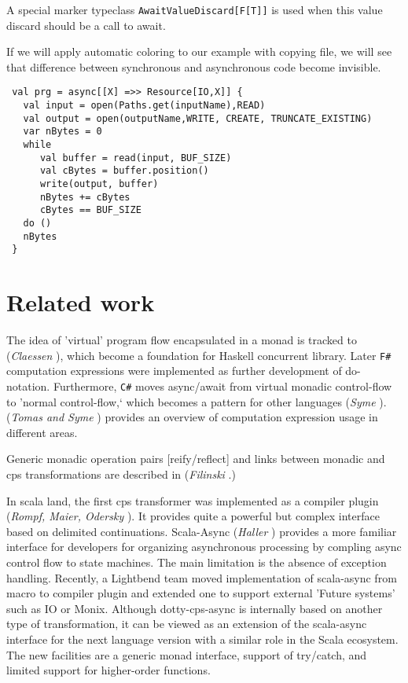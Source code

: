 \documentclass{llncs}
\begin{document}
 A special marker typeclass  \lstinline|AwaitValueDiscard[F[T]]| is used when this value discard should be a call to await.  

If we will apply automatic coloring to our example with copying file, we will see that difference between synchronous and asynchronous code become invisible.

\label{AACopyFileAC}
\begin{lstlisting}
 val prg = async[[X] =>> Resource[IO,X]] {
   val input = open(Paths.get(inputName),READ)
   val output = open(outputName,WRITE, CREATE, TRUNCATE_EXISTING)
   var nBytes = 0
   while
      val buffer = read(input, BUF_SIZE)
      val cBytes = buffer.position()
      write(output, buffer)
      nBytes += cBytes
      cBytes == BUF_SIZE
   do ()
   nBytes
 }
\end{lstlisting}



\section{ Related work } \label{RelatedWork}

The idea of 'virtual' program flow encapsulated in a monad is tracked to ({\it{Claessen}} \cite{claessen_1999}), which become a foundation for Haskell concurrent library.  Later \verb|F#| computation expressions were implemented as further development of do-notation. Furthermore, \verb|C#| moves async/await from virtual monadic control-flow to 'normal control-flow,‘  which becomes a pattern for other languages ({\it{Syme}} \cite{10.1145/3386325}). ({\it{Tomas and Syme}} \cite{computation-zoo-padl14}) provides an overview of computation expression usage in different areas.

 Generic monadic operation pairs [reify/reflect] and links between monadic and cps transformations are described in ({\it Filinski } \cite{10.1145/174675.178047}.)

 In scala land, the first cps transformer was implemented as a compiler plugin ({\it Rompf, Maier, Odersky })\cite{DBLP:conf/icfp/RompfMO09}. It provides quite a powerful but complex interface based on delimited continuations. 
  Scala-Async ({\it Haller} \cite{hallerScalaAsync}) provides a more familiar interface for developers for organizing asynchronous processing by compling async control flow to state machines. The main limitation is the absence of exception handling.  Recently, a Lightbend team moved implementation of scala-async from macro to compiler plugin and extended one to support external 'Future systems' such as IO or Monix.
  Although dotty-cps-async is internally based on another type of transformation, it can be viewed as an extension of the scala-async interface for the next language version with a similar role in the Scala ecosystem. The new facilities are a generic monad interface, support of try/catch, and limited support for higher-order functions.
  
\end{document}
